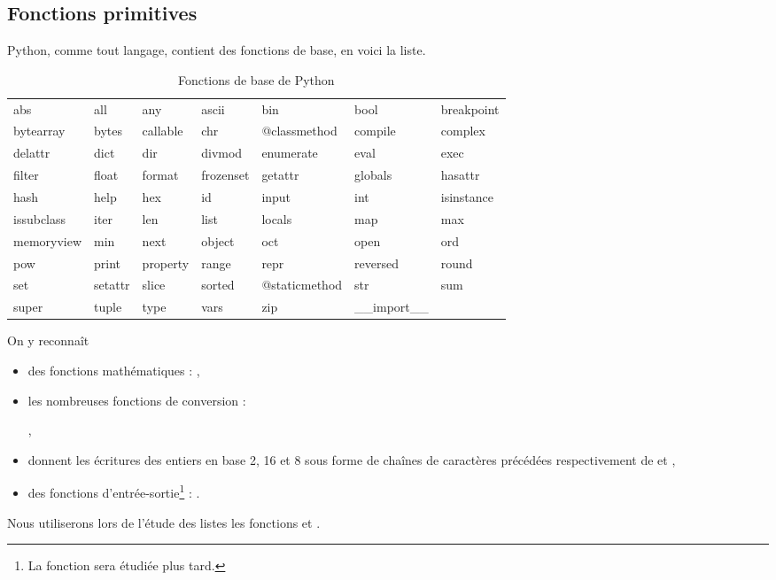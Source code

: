 \subsection{Fonctions primitives}
Python, comme tout langage, contient des fonctions de base, en voici la liste. 
\begin{table}[h]
\caption{Fonctions de base de Python}
\label{tab:coreFn}
\begin{center}
\begin{tabular}{lllllll}
abs&all&any&ascii&bin&bool&breakpoint\\
bytearray&bytes&callable&chr&@classmethod&compile&complex\\
delattr&dict&dir&divmod&enumerate&eval&exec\\
filter&float&format&frozenset&getattr&globals&hasattr\\
hash&help&hex&id&input&int&isinstance\\
issubclass&iter&len&list&locals&map&max\\
memoryview&min&next&object&oct&open&ord\\
pow&print&property&range&repr&reversed&round\\
set&setattr&slice&sorted&@staticmethod&str&sum\\
super&tuple&type&vars&zip&\_\_import\_\_\\    
\end{tabular}  
\end{center}
\end{table}
On y reconnaît
\begin{itemize}
\item des fonctions mathématiques : ,
\item les nombreuses fonctions de conversion : 

,
\item {} donnent les écritures des entiers en base 2, 16 et 8 sous forme de chaînes de caractères précédées respectivement de   et ,
\item des fonctions d'entrée-sortie\footnote{La fonction  sera étudiée plus tard.} : .
\end{itemize}
Nous utiliserons lors de l'étude des listes les fonctions  et .
 
